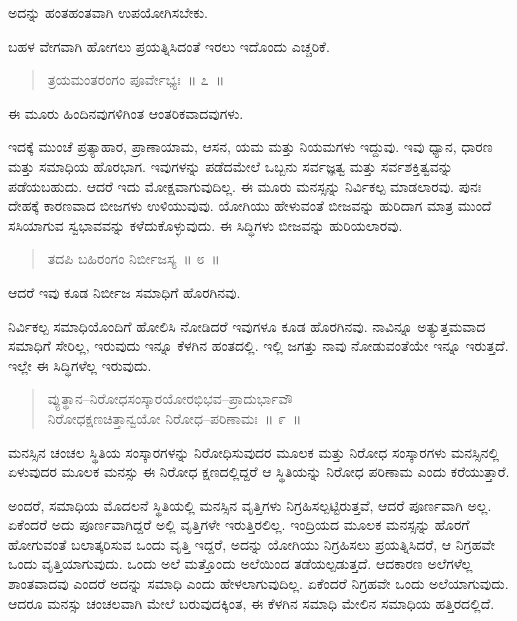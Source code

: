 \vspace{-0.3cm}

ಅದನ್ನು ಹಂತಹಂತವಾಗಿ ಉಪಯೋಗಿಸಬೇಕು. 

ಬಹಳ ವೇಗವಾಗಿ ಹೋಗಲು ಪ್ರಯತ್ನಿಸಿದಂತೆ ಇರಲು ಇದೊಂದು ಎಚ್ಚರಿಕೆ. 

\vspace{-0.3cm}

\begin{verse}
ತ್ರಯಮಂತರಂಗಂ ಪೂರ್ವೇಭ್ಯಃ~॥ ೭~॥
\end{verse}

\vspace{-0.3cm}

ಈ ಮೂರು ಹಿಂದಿನವುಗಳಿಗಿಂತ ಆಂತರಿಕವಾದವುಗಳು. 

ಇದಕ್ಕೆ ಮುಂಚೆ ಪ್ರತ್ಯಾಹಾರ, ಪ್ರಾಣಾಯಾಮ, ಆಸನ, ಯಮ ಮತ್ತು ನಿಯಮಗಳು ಇದ್ದುವು. ಇವು ಧ್ಯಾನ, ಧಾರಣ ಮತ್ತು ಸಮಾಧಿಯ ಹೊರಭಾಗ. ಇವುಗಳನ್ನು ಪಡೆದಮೇಲೆ ಒಬ್ಬನು ಸರ್ವಜ್ಞತ್ವ ಮತ್ತು ಸರ್ವಶಕ್ತಿತ್ವವನ್ನು ಪಡೆಯಬಹುದು. ಆದರೆ ಇದು ಮೋಕ್ಷವಾಗುವುದಿಲ್ಲ. ಈ ಮೂರು ಮನಸ್ಸನ್ನು ನಿರ್ವಿಕಲ್ಪ ಮಾಡಲಾರವು. ಪುನಃ ದೇಹಕ್ಕೆ ಕಾರಣವಾದ ಬೀಜಗಳು ಉಳಿಯುವುವು. ಯೋಗಿಯು ಹೇಳುವಂತೆ ಬೀಜವನ್ನು ಹುರಿದಾಗ ಮಾತ್ರ ಮುಂದೆ ಸಸಿಯಾಗುವ ಸ್ವಭಾವವನ್ನು ಕಳೆದುಕೊಳ್ಳುವುದು. ಈ ಸಿದ್ಧಿಗಳು ಬೀಜವನ್ನು ಹುರಿಯಲಾರವು. 

\vspace{-0.3cm}

\begin{verse}
ತದಪಿ ಬಹಿರಂಗಂ ನಿರ್ಬೀಜಸ್ಯ~॥ ೮~॥
\end{verse}

\vspace{-0.3cm}

ಆದರೆ ಇವು ಕೂಡ ನಿರ್ಬೀಜ ಸಮಾಧಿಗೆ ಹೊರಗಿನವು. 

ನಿರ್ವಿಕಲ್ಪ ಸಮಾಧಿಯೊಂದಿಗೆ ಹೋಲಿಸಿ ನೋಡಿದರೆ ಇವುಗಳೂ ಕೂಡ ಹೊರಗಿನವು. ನಾವಿನ್ನೂ ಅತ್ಯುತ್ತಮವಾದ ಸಮಾಧಿಗೆ ಸೇರಿಲ್ಲ, ಇರುವುದು ಇನ್ನೂ ಕೆಳಗಿನ ಹಂತದಲ್ಲಿ. ಇಲ್ಲಿ ಜಗತ್ತು ನಾವು ನೋಡುವಂತೆಯೇ ಇನ್ನೂ ಇರುತ್ತದೆ. ಇಲ್ಲೇ ಈ ಸಿದ್ಧಿಗಳೆಲ್ಲ ಇರುವುದು. 

\vspace{-0.3cm}

\begin{verse}
ವ್ಯುತ್ಥಾನ–ನಿರೋಧಸಂಸ್ಕಾರಯೋರಭಿಭವ–ಪ್ರಾದುರ್ಭಾವೌ\\ನಿರೋಧಕ್ಷಣಚಿತ್ತಾನ್ವಯೋ ನಿರೋಧ–ಪರಿಣಾಮಃ~॥ ೯~॥
\end{verse}

\vspace{-0.3cm}

ಮನಸ್ಸಿನ ಚಂಚಲ ಸ್ಥಿತಿಯ ಸಂಸ್ಕಾರಗಳನ್ನು ನಿರೋಧಿಸುವುದರ ಮೂಲಕ ಮತ್ತು ನಿರೋಧ ಸಂಸ್ಕಾರಗಳು ಮನಸ್ಸಿನಲ್ಲಿ ಏಳುವುದರ ಮೂಲಕ ಮನಸ್ಸು ಈ ನಿರೋಧ ಕ್ಷಣದಲ್ಲಿದ್ದರೆ ಆ ಸ್ಥಿತಿಯನ್ನು ನಿರೋಧ ಪರಿಣಾಮ ಎಂದು ಕರೆಯುತ್ತಾರೆ. 

ಅಂದರೆ, ಸಮಾಧಿಯ ಮೊದಲನೆ ಸ್ಥಿತಿಯಲ್ಲಿ ಮನಸ್ಸಿನ ವೃತ್ತಿಗಳು ನಿಗ್ರಹಿಸಲ್ಪಟ್ಟಿರುತ್ತವೆ, ಆದರೆ ಪೂರ್ಣವಾಗಿ ಅಲ್ಲ. ಏಕೆಂದರೆ ಅದು ಪೂರ್ಣವಾಗಿದ್ದರೆ ಅಲ್ಲಿ ವೃತ್ತಿಗಳೇ ಇರುತ್ತಿರಲಿಲ್ಲ. ಇಂದ್ರಿಯದ ಮೂಲಕ ಮನಸ್ಸನ್ನು ಹೊರಗೆ ಹೋಗುವಂತೆ ಬಲಾತ್ಕರಿಸುವ ಒಂದು ವೃತ್ತಿ ಇದ್ದರೆ, ಅದನ್ನು ಯೋಗಿಯು ನಿಗ್ರಹಿಸಲು ಪ್ರಯತ್ನಿಸಿದರೆ, ಆ ನಿಗ್ರಹವೇ ಒಂದು ವೃತ್ತಿಯಾಗುವುದು. ಒಂದು ಅಲೆ ಮತ್ತೊಂದು ಅಲೆಯಿಂದ ತಡೆಯಲ್ಪಡುತ್ತದೆ. ಆದಕಾರಣ ಅಲೆಗಳೆಲ್ಲ ಶಾಂತವಾದವು ಎಂದರೆ ಅದನ್ನು ಸಮಾಧಿ ಎಂದು ಹೇಳಲಾಗುವುದಿಲ್ಲ. ಏಕೆಂದರೆ ನಿಗ್ರಹವೇ ಒಂದು ಅಲೆಯಾಗುವುದು. ಆದರೂ ಮನಸ್ಸು ಚಂಚಲವಾಗಿ ಮೇಲೆ ಬರುವುದಕ್ಕಿಂತ, ಈ ಕೆಳಗಿನ ಸಮಾಧಿ ಮೇಲಿನ ಸಮಾಧಿಯ ಹತ್ತಿರದಲ್ಲಿದೆ. 

